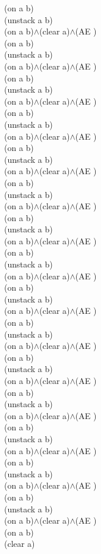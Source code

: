 {{(on a b)\\
(unstack a b)\\
(on a b)$\wedge$(clear a)$\wedge$(AE )\\
(on a b)\\
(unstack a b)\\
(on a b)$\wedge$(clear a)$\wedge$(AE )\\
(on a b)\\
(unstack a b)\\
(on a b)$\wedge$(clear a)$\wedge$(AE )\\
(on a b)\\
(unstack a b)\\
(on a b)$\wedge$(clear a)$\wedge$(AE )\\
(on a b)\\
(unstack a b)\\
(on a b)$\wedge$(clear a)$\wedge$(AE )\\
(on a b)\\
(unstack a b)\\
(on a b)$\wedge$(clear a)$\wedge$(AE )\\
(on a b)\\
(unstack a b)\\
(on a b)$\wedge$(clear a)$\wedge$(AE )\\
(on a b)\\
(unstack a b)\\
(on a b)$\wedge$(clear a)$\wedge$(AE )\\
(on a b)\\
(unstack a b)\\
(on a b)$\wedge$(clear a)$\wedge$(AE )\\
(on a b)\\
(unstack a b)\\
(on a b)$\wedge$(clear a)$\wedge$(AE )\\
(on a b)\\
(unstack a b)\\
(on a b)$\wedge$(clear a)$\wedge$(AE )\\
(on a b)\\
(unstack a b)\\
(on a b)$\wedge$(clear a)$\wedge$(AE )\\
(on a b)\\
(unstack a b)\\
(on a b)$\wedge$(clear a)$\wedge$(AE )\\
(on a b)\\
(unstack a b)\\
(on a b)$\wedge$(clear a)$\wedge$(AE )\\
(on a b)\\
(unstack a b)\\
(on a b)$\wedge$(clear a)$\wedge$(AE )\\
(on a b)\\
(clear a)\\
}%
}

